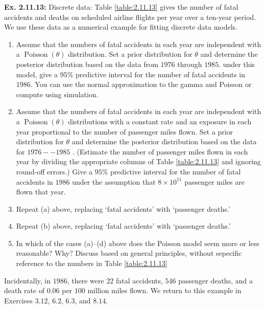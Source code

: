 \documentclass{article}
\newcommand\oname\operatorname
\begin{document}
\textbf{Ex. 2.11.13: }Discrete data: Table \ref{table:2.11.13} gives the number of fatal accidents and deaths on scheduled airline flights per year over a ten-year period. We use these data as a numerical example for fitting discrete data models.
\begin{enumerate}[label=\alph*]
	\item Assume that the numbers of fatal accidents in each year are independent with a $\oname{Poisson}(\theta)$ distribution. Set a prior distribution for $\theta$ and determine the posterior distribution based on the data from $1976$ through $1985$. under this model, give a $95\%$ predictive interval for the number of fatal accidents in $1986$. You can use the normal approximation to the gamma and Poisson or compute using simulation.
	\item Assume that the numbers of fatal accidents in each year are independent with a $\oname{Poisson}(\theta)$ distributions with a constant rate and an exposure in each year proportional to the number of passenger miles flown. Set a prior distribution for $\theta$ and determine the posterior distribution based on the data for $1976--1985$ . (Estimate the number of passenger miles flown in each year by dividing the appropriate columns of Table \ref{table:2.11.13} and ignoring round-off errors.) Give a $95\%$ predictive interval for the number of fatal accidents in $1986$ under the assumption that $8\times10^{11}$ passenger miles are flown that year.
	\item Repeat (a) above, replacing `fatal accidents' with `passenger deaths.'
	\item Repeat (b) above, replacing `fatal accidents' with `passenger deaths.'
	\item In which of the cases (a)--(d) above does the Poisson model seem more or less reasonable? Why? Discuss based on general principles, without sepecific reference to the numbers in Table \ref{table:2.11.13}
\end{enumerate}

Incidentally, in $1986$, there were $22$ fatal accidents, $546$ passenger deaths, and a death rate of $0.06$ per $100$ million miles flown. We return to this example in Exercises $3.12$, $6.2$, $6.3$, and $8.14$.
\end{document}
